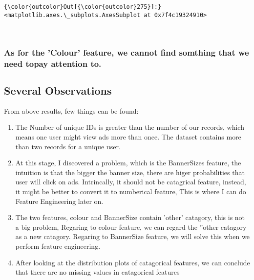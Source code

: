\documentclass[11pt]{article}
\begin{document}
\begin{Verbatim}[commandchars=\\\{\}]
{\color{outcolor}Out[{\color{outcolor}275}]:} <matplotlib.axes.\_subplots.AxesSubplot at 0x7f4c19324910>
\end{Verbatim}
            
    \begin{center}
    \end{center}
    { \hspace*{\fill} \\}
    
    \subsubsection{As for the 'Colour' feature, we cannot find somthing that
we need topay attention
to.}\label{as-for-the-colour-feature-we-cannot-find-somthing-that-we-need-topay-attention-to.}

    \subsection{Several Observations}\label{several-observations}

From above results, few things can be found:

\begin{enumerate}
\def\labelenumi{\arabic{enumi}.}
\item
  The Number of unique IDs is greater than the number of our records,
  which means one user might view ads more than once. The dataset
  contains more than two records for a unique user.
\item
  At this stage, I discovered a problem, which is the BannerSizes
  feature, the intuition is that the bigger the banner size, there are
  higer probabilities that user will click on ads. Intrincally, it
  should not be catagrical feature, instead, it might be better to
  convert it to numberical feature, This is where I can do Feature
  Engineering later on.
\item
  The two features, colour and BannerSize contain 'other' catagory, this
  is not a big problem, Regaring to colour feature, we can regard the
  ''other catagory as a new catagory. Regaring to BannerSize feature, we
  will solve this when we perform feature engineering.
\item
  After looking at the distribution plots of catagorical features, we
  can conclude that there are no missing values in catagorical features
\end{enumerate}
\end{document}

